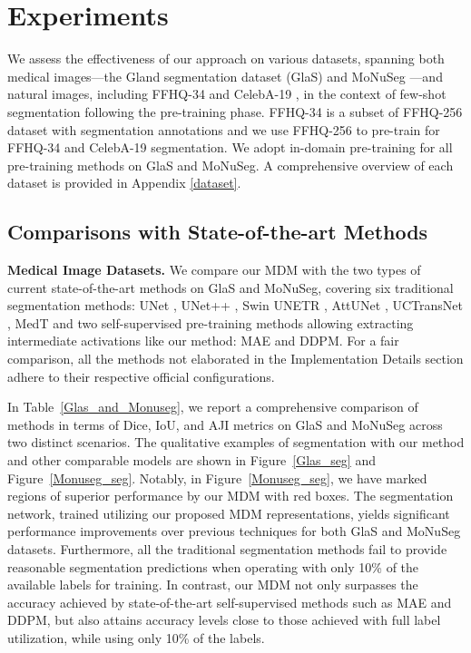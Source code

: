 \documentclass{article} \usepackage{iclr2024_conference,times}
\begin{document}
\section{Experiments}
We assess the effectiveness of our approach on various datasets, spanning both medical images—the Gland segmentation dataset (GlaS) \citep{DBLP:journals/mia/Sirinukunwattana17} and MoNuSeg \citep{DBLP:journals/tmi/KumarVSBVS17,DBLP:journals/tmi/KumarVAZOTCHLHW20}—and natural images, including FFHQ-34 and CelebA-19 \citep{DBLP:conf/iclr/BaranchukVRKB22}, in the context of few-shot segmentation following the pre-training phase.
FFHQ-34 is a subset of FFHQ-256 dataset \citep{DBLP:conf/cvpr/KarrasLA19} with segmentation annotations and we use FFHQ-256 to pre-train for FFHQ-34 and CelebA-19 segmentation. We adopt in-domain pre-training for all pre-training methods on GlaS and MoNuSeg. A comprehensive overview of each dataset is provided in Appendix \ref{dataset}.

\subsection{Comparisons with State-of-the-art Methods}
\textbf{Medical Image Datasets.} We compare our MDM with the two types of current state-of-the-art methods on GlaS and MoNuSeg, covering six traditional segmentation methods: UNet \citep{DBLP:conf/miccai/RonnebergerFB15}, UNet++ \citep{DBLP:conf/miccai/ZhouSTL18}, Swin UNETR \citep{DBLP:conf/brainles-ws/HatamizadehNTYR21}, AttUNet \citep{10.1007/978-3-031-09002-8_27}, UCTransNet \citep{DBLP:conf/aaai/Wang0WZ22}, MedT \citep{DBLP:conf/miccai/ValanarasuOHP21} and two self-supervised pre-training methods allowing extracting intermediate activations like our method: MAE and DDPM. For a fair comparison, all the methods not elaborated in the Implementation Details section adhere to their respective official configurations.


In Table~\ref{Glas_and_Monuseg}, we report a comprehensive comparison of methods in terms of Dice, IoU, and AJI metrics on GlaS and MoNuSeg across two distinct scenarios. The qualitative examples of segmentation with our method and other comparable models are shown in Figure~\ref{Glas_seg} and Figure~\ref{Monuseg_seg}. 
Notably, in  Figure~\ref{Monuseg_seg}, we have marked regions of superior performance by our MDM with red boxes. The segmentation network, trained utilizing our proposed MDM representations, yields significant performance improvements over previous techniques for both GlaS and MoNuSeg datasets.  Furthermore, all the traditional segmentation methods fail to provide reasonable segmentation predictions when operating with only 10\% of the available labels for training. In contrast, our MDM not only surpasses the accuracy achieved by state-of-the-art self-supervised methods such as MAE and DDPM, but also attains accuracy levels close to those achieved with full label utilization, while using only 10\% of the labels.
\end{document}
